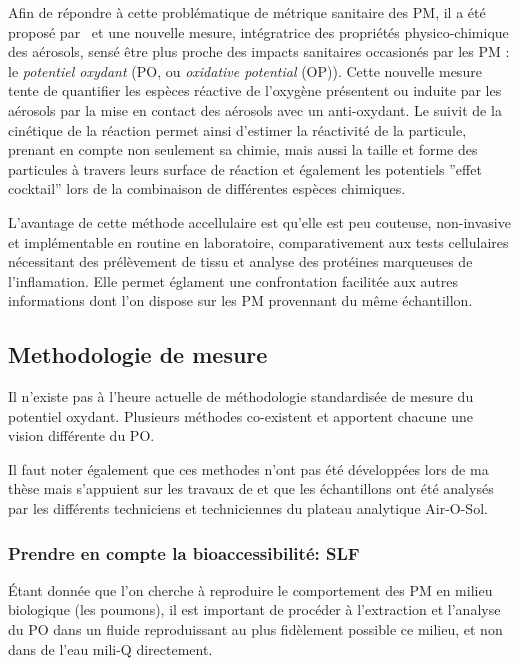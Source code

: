 Afin de répondre à cette problématique de métrique sanitaire des PM, il a été proposé
par~\textcite{zielinskiModeling1999} et \textcite{choRedox2005} une nouvelle mesure,
intégratrice des propriétés physico-chimique des aérosols, sensé être plus proche des
impacts sanitaires occasionés par les PM : le \textit{potentiel oxydant} (PO, ou
\textit{oxidative potential} (OP)).
Cette nouvelle mesure tente de quantifier les espèces réactive de l'oxygène présentent
ou induite par les aérosols par la mise en contact des aérosols avec un anti-oxydant.
Le suivit de la cinétique de la réaction permet ainsi d'estimer la réactivité de la
particule, prenant en compte non seulement sa chimie, mais aussi la taille et forme des
particules à travers leurs surface de réaction et également les potentiels ''effet
cocktail'' lors de la combinaison de différentes espèces chimiques.

L'avantage de cette méthode accellulaire est qu'elle est peu couteuse, non-invasive et
implémentable en routine en laboratoire, comparativement aux tests cellulaires nécessitant
des prélèvement de tissu et analyse des protéines marqueuses de l'inflamation.
Elle permet églament une confrontation facilitée aux autres informations dont l'on dispose
sur les PM provennant du même échantillon.

\subsection{Methodologie de mesure}%
\label{sub:methodologie_de_mesure}

Il n'existe pas à l'heure actuelle de méthodologie standardisée de mesure du potentiel
oxydant. Plusieurs méthodes co-existent et apportent chacune une vision différente du PO.

Il faut noter également que ces methodes n'ont pas été développées lors de ma thèse mais
s'appuient sur les travaux de \textcite{calasPollution2017} et que les échantillons ont été
analysés par les différents techniciens et techniciennes du plateau analytique Air-O-Sol.

\subsubsection{Prendre en compte la bioaccessibilité: SLF}%
\label{sub:prendre_en_compte_la_bioaccessibilite_slf}

Étant donnée que l'on cherche à reproduire le comportement des PM en milieu biologique
(les poumons), il est important de procéder à l'extraction et l'analyse du PO dans un
fluide reproduissant au plus fidèlement possible ce milieu, et non dans de l'eau mili-Q
directement.


